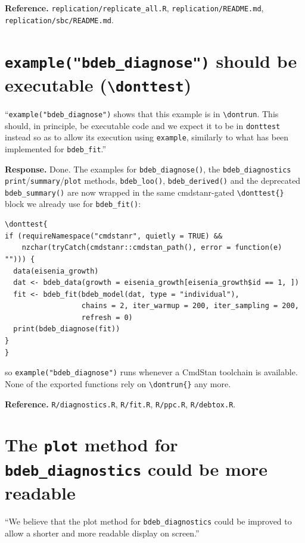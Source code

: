 \documentclass[11pt,a4paper]{article}
\newcommand{\code}[1]{\texttt{#1}}
\newcommand{\pkg}[1]{\textsf{#1}}
\begin{document}
\textbf{Reference.} \code{replication/replicate\_all.R},
\code{replication/README.md}, \code{replication/sbc/README.md}.

\section{\code{example("bdeb\_diagnose")} should be executable
(\code{\textbackslash donttest})}

\begin{displayquote}
``\verb|example("bdeb_diagnose")| shows that this example is in
\code{\textbackslash dontrun}. This should, in principle, be executable
code and we expect it to be in \code{donttest} instead so as to allow
its execution using \code{example}, similarly to what has been
implemented for \code{bdeb\_fit}.''
\end{displayquote}

\textbf{Response.} Done. The examples for \code{bdeb\_diagnose()}, the
\code{bdeb\_diagnostics} \code{print}/\code{summary}/\code{plot} methods,
\code{bdeb\_loo()}, \code{bdeb\_derived()} and the deprecated
\code{bdeb\_summary()} are now wrapped in the same \pkg{cmdstanr}-gated
\code{\textbackslash donttest\{\}} block we already use for
\code{bdeb\_fit()}:
\begin{Verbatim}[fontsize=\small]
\donttest{
if (requireNamespace("cmdstanr", quietly = TRUE) &&
    nzchar(tryCatch(cmdstanr::cmdstan_path(), error = function(e) ""))) {
  data(eisenia_growth)
  dat <- bdeb_data(growth = eisenia_growth[eisenia_growth$id == 1, ])
  fit <- bdeb_fit(bdeb_model(dat, type = "individual"),
                  chains = 2, iter_warmup = 200, iter_sampling = 200,
                  refresh = 0)
  print(bdeb_diagnose(fit))
}
}
\end{Verbatim}
\noindent so \verb|example("bdeb_diagnose")| runs whenever a CmdStan
toolchain is available. None of the exported functions rely on
\code{\textbackslash dontrun\{\}} any more.

\textbf{Reference.} \code{R/diagnostics.R}, \code{R/fit.R},
\code{R/ppc.R}, \code{R/debtox.R}.

\section{The \code{plot} method for \code{bdeb\_diagnostics} could be
more readable}

\begin{displayquote}
``We believe that the plot method for \code{bdeb\_diagnostics} could be
improved to allow a shorter and more readable display on screen.''
\end{displayquote}
\end{document}
